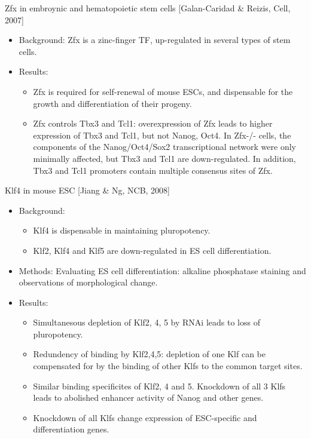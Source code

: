 \documentclass{report}
\begin{document}
Zfx in embroynic and hematopoietic stem cells [Galan-Caridad \& Reizis, Cell, 2007]
\begin{itemize}
	\item Background: Zfx is a zinc-finger TF, up-regulated in several types of stem cells. 
	
	\item Results: 
	\begin{itemize}
		\item Zfx is required for self-renewal of mouse ESCs, and dispensable for the growth and differentiation of their progeny. 
		\item Zfx controls Tbx3 and Tcl1: overexpression of Zfx leads to higher expression of Tbx3 and Tcl1, but not Nanog, Oct4. In Zfx-/- cells, the components of the Nanog/Oct4/Sox2 transcriptional network were only minimally affected, but Tbx3 and Tcl1 are down-regulated. In addition, Tbx3 and Tcl1 promoters contain multiple consensus sites of Zfx.
	\end{itemize}
\end{itemize}
	
Klf4 in mouse ESC [Jiang \& Ng, NCB, 2008]
\begin{itemize}
	\item Background: 
	\begin{itemize}
		\item Klf4 is dispensable in maintaining pluropotency. 
		\item Klf2, Klf4 and Klf5 are down-regulated in ES cell differentiation. 
	\end{itemize}
	
	\item Methods: Evaluating ES cell differentiation: alkaline phosphatase staining and observations of morphological change. 
	
	\item Results: 
	\begin{itemize}
		\item Simultanesous depletion of Klf2, 4, 5 by RNAi leads to loss of pluropotency. 
		\item Redundency of binding by Klf2,4,5: depletion of one Klf can be compensated for by the binding of other Klfs to the common target sites. 
		\item Similar binding specificites of Klf2, 4 and 5. Knockdown of all 3 Klfs leads to abolished enhancer activity of Nanog and other genes. 
		\item Knockdown of all Klfs change expression of ESC-specific and differentiation genes. 
	\end{itemize}
\end{itemize}	
	
\end{document}
